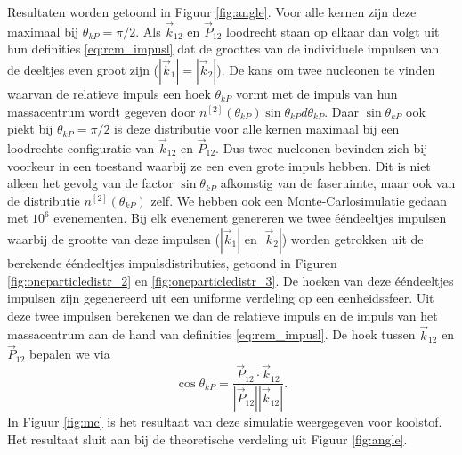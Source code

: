 \documentclass[11pt,twoside]{book}
\begin{document}
Resultaten worden getoond in Figuur \ref{fig:angle}. Voor alle kernen zijn deze maximaal bij $\theta_{kP} = \pi/2$. Als $\vec{k}_{12}$ en $\vec{P}_{12}$ loodrecht staan op elkaar dan volgt uit hun  definities \eqref{eq:rcm_impusl} dat de groottes van de individuele impulsen van de deeltjes even groot zijn ($|\vec{k}_1| = |\vec{k}_2|$). De kans om twee nucleonen te vinden waarvan de relatieve impuls een hoek $\theta_{kP}$ vormt met de impuls van hun massacentrum wordt gegeven door $n^{[2]}(\theta_{kP})\sin{\theta_{kP}}d\theta_{kP}$. Daar $\sin{\theta_{kP}}$ ook piekt bij $\theta_{kP} = \pi/2$ is deze distributie voor alle kernen maximaal bij een loodrechte configuratie van $\vec{k}_{12}$ en $\vec{P}_{12}$. Dus twee nucleonen bevinden zich bij voorkeur in een toestand waarbij ze een even grote impuls hebben. Dit is niet alleen het gevolg van de factor $\sin{\theta_{kP}}$ afkomstig van de faseruimte, maar ook van de distributie $n^{[2]}(\theta_{kP})$ zelf.  We hebben ook een Monte-Carlosimulatie gedaan met $10^6$ evenementen. Bij elk evenement genereren we twee \'{e}\'{e}ndeeltjes impulsen waarbij de grootte van deze impulsen ($|\vec{k}_1|$ en $|\vec{k}_2|$) worden getrokken uit de berekende \'{e}\'{e}ndeeltjes impulsdistributies, getoond in Figuren \ref{fig:oneparticledistr_2} en \ref{fig:oneparticledistr_3}. De hoeken van deze \'{e}\'{e}ndeeltjes impulsen zijn gegenereerd uit een uniforme verdeling op een eenheidssfeer. Uit deze twee impulsen berekenen we dan de relatieve impuls en de impuls van het massacentrum aan de hand van definities \eqref{eq:rcm_impusl}. De hoek tussen $\vec{k}_{12}$ en $\vec{P}_{12}$ bepalen we via
\begin{equation} \label{eq:thetakp}
\cos{\theta_{kP}} = \frac{\vec{P}_{12} \cdot \vec{k}_{12}}{|\vec{P}_{12}| |\vec{k}_{12}|}.
\end{equation}
In Figuur \ref{fig:mc} is het resultaat van deze simulatie weergegeven voor koolstof. Het resultaat sluit aan bij de theoretische verdeling uit Figuur \ref{fig:angle}.
\end{document}
